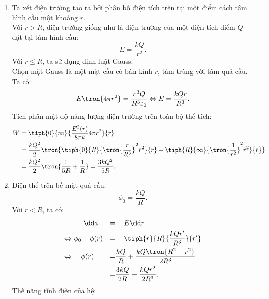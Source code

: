 \begin{loigiai}
\begin{enumerate}[1)]
        \item Ta xét điện trường tạo ra bởi phân bố điện tích trên tại một điểm cách tâm hình cầu một khoảng $r$.\\
        Với $r>R$, điện trường giống như là điện trường của một điện tích điểm $Q$ đặt tại tâm hình cầu:
        \begin{equation*}
            E=\dfrac{kQ}{r^2}.
        \end{equation*}
        Với $r\leq R$, ta sử dụng định luật Gauss.\\
        Chọn mặt Gauss là một mặt cầu có bán kính $r$, tâm trùng với tâm quả cầu. Ta có:
        \begin{equation*}
            \begin{aligned}
                E\tron{4\pi r^2}=\dfrac{r^3Q}{R^3\varepsilon_0}
                \Leftrightarrow E=\dfrac{kQr}{R^3}.
            \end{aligned}
        \end{equation*}
        Tích phân mật độ năng lượng điện trường trên toàn bộ thể tích:
        \begin{equation*}
            \begin{aligned}
                W&=\tiph{0}{\infty}{\dfrac{E^2(r)}{8\pi k}4\pi r^2}{r}\\
                &=\dfrac{kQ^2}{2}\tron{\tiph{0}{R}{\tron{\dfrac{r}{R^3}}^2r^2}{r}+\tiph{R}{\infty}{\tron{\dfrac{1}{r^2}}^2r^2}{r}}\\
                &=\dfrac{kQ^2}{2}\tron{\dfrac{1}{5R}+\dfrac{1}{R}}=\dfrac{3kQ^2}{5R}.
            \end{aligned}
        \end{equation*}
        \item Điện thế trên bề mặt quả cầu: 
        $$\phi_0=\dfrac{kQ}{R}.$$
        Với $r<R$, ta có:
        \begin{equation*}
        \begin{aligned}
             &\ ~~~ \dd \phi &=& -E\dd r\\
             \Leftrightarrow ~& \phi_0-\phi(r) &=&-\tiph{r}{R}{\dfrac{kQr'}{R^3}}{r'}\\
             \Leftrightarrow~ &\quad \phi(r)&=&\dfrac{kQ}{R}+\dfrac{kQ\tron{R^2-r^2}}{2R^3}\\
             &\ &=&\dfrac{3kQ}{2R}-\dfrac{kQr^2}{2R^3}.
        \end{aligned}
        \end{equation*}
        Thế năng tĩnh điện của hệ: 
        \begin{equation*}

\end{equation*}
\end{enumerate}
\end{loigiai}
